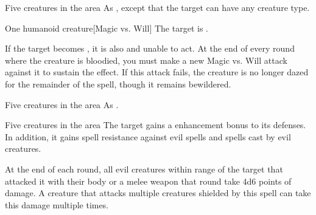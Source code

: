 \begin{spelltargets}{Five creatures in the area}
    \spellsuccess As , except that the target can have any creature type.
\end{spelltargets}

\spellrng{\rngclose}
\begin{spelltarget}{One humanoid creature}[Magic vs. Will]
    \spellsuccess The target is \bewildered.

    If the target becomes \bloodied, it is also \dazed and unable to act. At the end of every round where the creature is bloodied, you must make a new Magic vs. Will attack against it to sustain the effect. If this attack fails, the creature is no longer dazed for the remainder of the spell, though it remains bewildered.
\end{spelltarget}

\begin{spelltargets}{Five creatures in the area}
    \spellsuccess As .
\end{spelltargets}

\spelldur{\durshort \dismissable}
\begin{spelltargets}{Five creatures in the area}
    The target gains a  enhancement bonus to its defenses. In addition, it gains spell resistance against evil spells and spells cast by evil creatures.
    \par At the end of each round, all evil creatures within \rngclose range of the target that attacked it with their body or a melee weapon that round take 4d6 points of damage. A creature that attacks multiple creatures shielded by this spell can take this damage multiple times.
\end{spelltargets}
\spellline
{}

